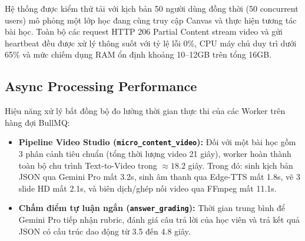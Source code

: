 Hệ thống được kiểm thử tải với kịch bản 50 người dùng đồng thời (50 concurrent users) mô phỏng một lớp học đang cùng truy cập Canvas và thực hiện tương tác bài học. Toàn bộ các request HTTP 206 Partial Content stream video và gửi heartbeat đều được xử lý thông suốt với tỷ lệ lỗi 0\%, CPU máy chủ duy trì dưới 65\% và mức chiếm dụng RAM ổn định khoảng 10--12GB trên tổng 16GB.

\subsection{Async Processing Performance}

Hiệu năng xử lý bất đồng bộ đo lường thời gian thực thi của các Worker trên hàng đợi BullMQ:
\begin{itemize}
    \item \textbf{Pipeline Video Studio (\texttt{micro\_content\_video}):} Đối với một bài học gồm 3 phân cảnh tiêu chuẩn (tổng thời lượng video 21 giây), worker hoàn thành toàn bộ chu trình Text-to-Video trong $\approx 18.2$ giây. Trong đó: sinh kịch bản JSON qua Gemini Pro mất 3.2s, sinh âm thanh qua Edge-TTS mất 1.8s, vẽ 3 slide HD mất 2.1s, và biên dịch/ghép nối video qua FFmpeg mất 11.1s.
    \item \textbf{Chấm điểm tự luận ngắn (\texttt{answer\_grading}):} Thời gian trung bình để Gemini Pro tiếp nhận rubric, đánh giá câu trả lời của học viên và trả kết quả JSON có cấu trúc dao động từ 3.5 đến 4.8 giây.
\end{itemize}

